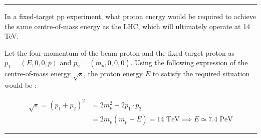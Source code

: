 \noindent\rule{7in}{1.5pt}


\begin{problem}{1.10}
In a fixed-target pp experiment, what proton energy would be required to achieve the same centre-of-mass energy as the LHC, which will ultimately operate at 14 TeV.
\end{problem}
\begin{solution}
Let the four-momentum of the beam proton and the fixed target proton as $p_1 = (E,0,0,p)$ and $p_2 = (m_p,0,0,0)$. Using the following expression of the centre-of-mass energy $\sqrt{s}$, the proton energy $E$ to satisfy the required situation would be :

\begin{align*}
    \sqrt{s} = (p_1 + p_2) ^2 &= 2m_p^2 + 2 p_1 \cdot p_2 \\[0.15in]
                              &= 2m_p \left( m_p + E \right) = 14 \text{ TeV} \implies \boxed{E \simeq 7.4 \text{ PeV}}
\end{align*}
\end{solution} 

\noindent\rule{7in}{1.5pt}
    

